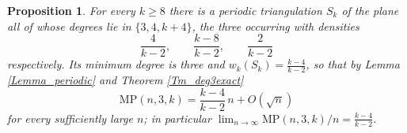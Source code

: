 \documentclass[12pt,a4paper]{article}%
\newtheorem{proposition}[theorem]{Proposition}
\begin{document}


\begin{proposition}
\label{Prop_deg3}For every $k\geq 8$ there is a periodic triangulation $S_{k}$ of the plane all of whose degrees
lie in $\{3,4,k+4\}$, the three occurring with densities
\[
\frac{4}{k-2},\qquad \frac{k-8}{k-2},\qquad \frac{2}{k-2}
\]
respectively. Its minimum degree is three and $w_{k}(S_{k})=\frac{k-4}{k-2}$, so that by Lemma
\ref{Lemma_periodic} and Theorem \ref{Tm_deg3exact}
\[
\mathrm{MP}(n,3,k)=\frac{k-4}{k-2}\,n+O(\sqrt{n})
\]
for every sufficiently large $n$; in particular $\lim_{n\to \infty }\mathrm{MP}(n,3,k)/n=\frac{k-4}{k-2}$.
\end{proposition}
\end{document}
